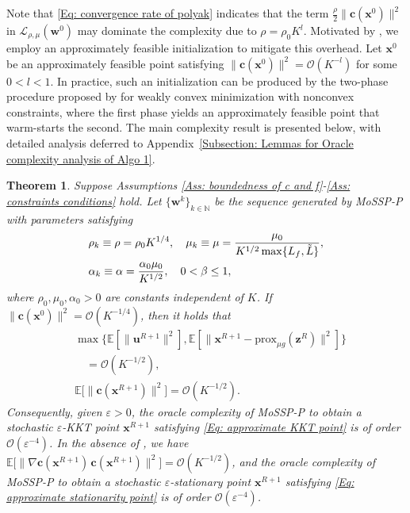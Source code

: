 \documentclass{article}
\theoremstyle{plain}
\newtheorem{theorem}{Theorem}[section]
\theoremstyle{definition}
\theoremstyle{remark}
\newcommand{\EE}{\mathbb{E}}
\newcommand{\NN}{\mathbb{N}}
\newcommand{\prox}{\mathrm{prox}}
\newcommand{\bx}{\bm{x}}
\newcommand{\bc}{\bm{c}}
\newcommand{\bu}{\bm{u}}
\newcommand{\bz}{\bm{z}}
\newcommand{\calL}{\mathcal{L}}
\newcommand{\calO}{\mathcal{O}}
\newcommand{\bw}{\bm{w}}
\numberwithin{equation}{section}
\begin{document}
Note that \eqref{Eq: convergence rate of polyak} indicates that the term $\frac{\rho}{2}\|\bc(\bx^{0})\|^{2}$ in $\calL_{\rho, \mu}(\bw^{0})$ may dominate the complexity due to $\rho = \rho_0 K^{l}$. Motivated by \citet{xie2021complexity,jin2022stochastic}, we employ an approximately feasible initialization to mitigate this overhead. Let $\bx^{0}$ be an approximately feasible point satisfying $\|\bc(\bx^{0})\|^{2} = \calO(K^{-l})$ for some $0<l<1$. In practice, such an initialization can be produced by the two-phase procedure proposed by \citet{jin2025stochastic} for weakly convex minimization with nonconvex constraints, where the first phase yields an approximately feasible point that warm-starts the second.
The main complexity result is presented below, with detailed analysis deferred to Appendix~\ref{Subsection: Lemmas for Oracle complexity analysis of Algo 1}.
\begin{theorem}
    \label{Theorem: the convergence rate of polyak with initial feasibility}
Suppose Assumptions \ref{Ass: boundedness of c and f}-\ref{Ass: constraints conditions} hold. Let $\{\bw^k\}_{k \in \NN}$ be the sequence generated by MoSSP-P
with parameters satisfying 
\begin{align}
    \label{Eq: the parameter conditions in Polyak}
    &\rho_{k} \equiv \rho = {\rho_0} K^{1/4}, \quad \mu_{k} \equiv \mu = \frac{\mu_0}{K^{1/2}\max\{L_f, \tilde{L}\}}, \notag \\
    &\alpha_{k} \equiv \alpha = \frac{\alpha_0 \mu_0}{K^{1/2}}, \quad 0 < \beta \leq 1,
\end{align}
where $\rho_0, \mu_0, \alpha_0 > 0$ are constants independent of $K$. If $\| \bc (\bx^{0}) \|^{2}= \calO(K^{-1/4})$, then it holds that
{
    \begin{equation}
    \label{Eq: the convergence rate of Polyak}
\begin{aligned}
&\max\bigl\{ \EE[\|\bu^{R+1}\|^{2}],
\EE[\|\bx^{R+1}-\prox_{\mu g}(\bz^{R})\|^{2}] \bigr\} \\
&\quad = \calO(K^{-1/2}), \\
&\EE\bigl[\|\bc(\bx^{R+1})\|^{2}\bigr]
= \calO(K^{-1/2}).
\end{aligned}
    \end{equation}
}{Consequently, given $\varepsilon > 0$, the oracle complexity of MoSSP-P to obtain a stochastic $\varepsilon$-KKT point $\bx^{R+1}$ satisfying \eqref{Eq: approximate KKT point} is of order $\calO(\varepsilon^{-4})$. In the absence of , we have $\EE\bigl[\|\nabla \bc(\bx^{R+1})\,\bc(\bx^{R+1})\|^{2}\bigr] = \calO(K^{-1/2})$, and the oracle complexity of MoSSP-P to obtain a stochastic $\varepsilon$-stationary point $\bx^{R+1}$ satisfying \eqref{Eq: approximate stationarity point} is of order $\calO(\varepsilon^{-4})$.}
\end{theorem}
\end{document}
